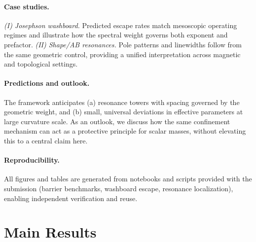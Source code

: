 \documentclass[11pt]{article}
\theoremstyle{definition}
\begin{document}
	\paragraph{Case studies.}
	\emph{(I) Josephson washboard.} Predicted escape rates match mesoscopic operating regimes and illustrate how the spectral weight governs both exponent and prefactor. 
	\emph{(II) Shape/AB resonances.} Pole patterns and linewidths follow from the same geometric control, providing a unified interpretation across magnetic and topological settings.
	
	\paragraph{Predictions and outlook.}
	The framework anticipates (a) resonance towers with spacing governed by the geometric weight, and (b) small, universal deviations in effective parameters at large curvature scale. As an outlook, we discuss how the same confinement mechanism can act as a protective principle for scalar masses, without elevating this to a central claim here.
	
	\paragraph{Reproducibility.}
	All figures and tables are generated from notebooks and scripts provided with the submission (barrier benchmarks, washboard escape, resonance localization), enabling independent verification and reuse.
	
	
	\section{Main Results}
	\label{sec:main-results}
	
\end{document}
